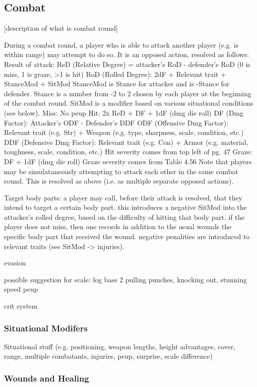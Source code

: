 \documentclass[12pt]{article}
\newcommand{\notes}[1]{{\color{Tan} #1}}
\begin{document}
\subsection{Combat}
\notes{[description of what is combat round]

	During a combat round, a player who is able to attack another player (e.g. is within range) may attempt to do so.
	It is an opposed action, resolved as follows:
		Result of attack: ReD (Relative Degree) = attacker's RoD - defender's RoD (0 is miss, 1 is graze, >1 is hit)
			RoD (Rolled Degree): 2dF + Relevant trait + StanceMod + SitMod
				StanceMod is Stance for attacker and is -Stance for defender.
					Stance is a number from -2 to 2 chosen by each player at the beginning of the combat round.
				SitMod is a modifier based on various situational conditions (see below).
		Miss: No peup
		Hit: 2x ReD + DF + 1dF (dmg die roll)
			DF (Dmg Factor): Attacker's ODF - Defender's DDF
				ODF (Offensive Dmg Factor): Relevant trait (e.g. Str) + Weapon (e.g. type, sharpness, scale, condition, etc.)
				DDF (Defensive Dmg Factor): Relevant trait (e.g. Con) + Armor (e.g. material, toughness, scale, condition, etc.)
			Hit severity comes from top left of pg. 47
		Graze: DF + 1dF (dmg die roll)
			Graze severity comes from Table 4.56
	Note that players may be simulataneously attempting to attack each other in the same combat round.
	This is resolved as above (i.e. as multiple separate opposed actions).

Target body parts:
a player may call, before their attack is resolved, that they intend to target a certain body part.
this introduces a negative SitMod into the attacker's rolled degree, based on the difficulty of hitting that body part.
if the player does not miss, then one records in addition to the usual wounds the specific body part that received the wound.
negative penalities are introduced to relevant traits (see SitMod -> injuries).

evasion

	possible suggestion for scale: log base 2
pulling punches, knocking out, stunning
speed
peup

crit system}

\subsubsection{Situational Modifers}
\notes{Situational stuff (e.g. positioning, weapon lengths, height advantages, cover, range, multiple combatants, injuries, peup, surprise, scale difference)}

\subsubsection{Wounds and Healing}\label{sec:wounds}
\end{document}
